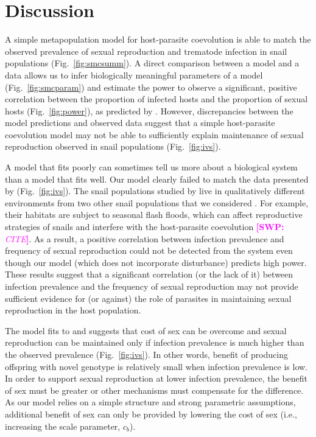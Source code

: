 \documentclass{article}\usepackage[]{graphicx}\usepackage[]{color}
\newcommand{\comment}[3]{\textcolor{#1}{\textbf{[#2: }\textit{#3}\textbf{]}}}
\newcommand{\swp}[1]{\comment{magenta}{SWP}{#1}}
\newcommand{\fref}[1]{Fig.~\ref{fig:#1}}
\begin{document}
\section{Discussion}

A simple metapopulation model for host-parasite coevolution is able to match the observed prevalence of sexual reproduction and trematode infection in snail populations (\fref{smcsumm}).
A direct comparison between a model and a data allows us to infer biologically meaningful parameters of a model (\fref{smcparam}) and estimate the power to observe a significant, positive correlation between the proportion of infected hosts and the proportion of sexual hosts (\fref{power}), as predicted by \cite{lively1992parthenogenesis}.
However, discrepancies between the model predictions and observed data suggest that a simple host-parasite coevolution model may not be able to sufficiently explain maintenance of sexual reproduction observed in snail populations (\fref{ivs}).

A model that fits poorly can sometimes tell us more about a biological system than a model that fits well.
Our model clearly failed to match the data presented by \cite{dagan2013clonal} (\fref{ivs}).
The snail populations studied by \cite{dagan2013clonal} live in qualitatively different environments from two other snail populations that we considered \citep{vergara2014infection, mckone2016fine}.
For example, their habitats are subject to seasonal flash floods, which can affect reproductive strategies of snails \citep{ben2007temporal} and interfere with the host-parasite coevolution \swp{CITE}.
As a result, a positive correlation between infection prevalence and frequency of sexual reproduction could not be detected from the system even though our model (which does not incorporate disturbance) predicts high power.
These results suggest that a significant correlation (or the lack of it) between infection prevalence and the frequency of sexual reproduction may not provide sufficient evidence for (or against) the role of parasites in maintaining sexual reproduction in the host population.

The model fits to \cite{dagan2013clonal} and \cite{mckone2016fine} suggests that cost of sex can be overcome and sexual reproduction can be maintained only if infection prevalence is much higher than the observed prevalence (\fref{ivs}).
In other words, benefit of producing offspring with novel genotype is relatively small when infection prevalence is low.
In order to support sexual reproduction at lower infection prevalence, the benefit of sex must be greater or other mechanisms must compensate for the difference.
As our model relies on a simple structure and strong parametric assumptions, additional benefit of sex can only be provided by lowering the cost of sex (i.e., increasing the scale parameter, $c_b$).
\end{document}
